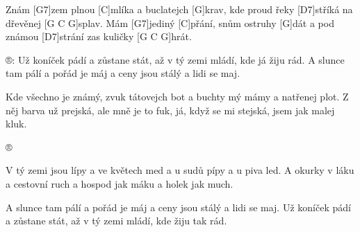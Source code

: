 
Znám [G7]zem plnou [C]mlíka a buclatejch [G]krav,
kde proud řeky [D7]stříká na dřevěnej [G C G]splav.
Mám [G7]jediný [C]přání, snům ostruhy [G]dát
a pod známou [D7]strání zas kuličky [G C G]hrát.

®: Už koníček pádí a zůstane stát,
až v tý zemi mládí, kde já žiju rád.
A slunce tam pálí a pořád je máj
a ceny jsou stálý a lidi se maj.

Kde všechno je známý, zvuk tátovejch bot
a buchty mý mámy a natřenej plot.
Z něj barva už prejská, ale mně je to fuk,
já, když se mi stejská, jsem jak malej kluk.

®

V tý zemi jsou lípy a ve květech med
a u sudů pípy a u piva led.
A okurky v láku a cestovní ruch
a hospod jak máku a holek jak much.

A slunce tam pálí a pořád je máj
a ceny jsou stálý a lidi se maj.
Už koníček pádí a zůstane stát,
až v tý zemi mládí, kde žiju tak rád.

